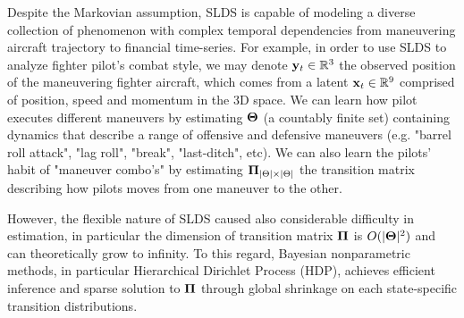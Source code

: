 \documentclass{article} %
\begin{document}
Despite the Markovian assumption, SLDS is capable of modeling a diverse collection of phenomenon with complex temporal dependencies from maneuvering aircraft trajectory to financial time-series. For example, in order to use SLDS to analyze fighter pilot's combat style, we may denote ${\bf y}_t \in {\mathbb R}^3$ the observed position of the maneuvering fighter aircraft, which comes  from a latent ${\bf x}_t \in {\mathbb R}^9$ comprised of position, speed and momentum in the 3D space. We can learn how pilot executes different maneuvers by estimating $\boldsymbol{\Theta}$ (a countably finite set) containing dynamics that describe a range of offensive and defensive maneuvers (e.g. "barrel roll attack", "lag roll", "break", "last-ditch", etc). We can also learn the pilots' habit of "maneuver combo's" by estimating $\boldsymbol{\Pi}_{|\Theta| \times |\Theta|}$ the transition matrix describing how pilots moves from one maneuver to the other.

However, the flexible nature of SLDS caused also considerable  difficulty in estimation, in particular the dimension of transition matrix $\boldsymbol{\Pi}$ is  $O(|\boldsymbol{\Theta}|^2)$ and can theoretically grow to infinity. To this regard, Bayesian nonparametric methods, in particular Hierarchical Dirichlet Process (HDP), achieves efficient inference and sparse solution to $\boldsymbol{\Pi}$ through global shrinkage on each state-specific transition distributions.
\end{document}
